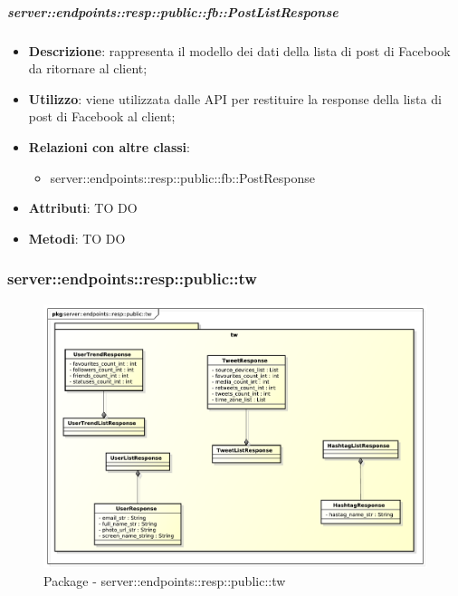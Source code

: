     \subparagraph{server::endpoints::resp::public::fb::PostListResponse} %
    \label{subp:bdsm_app_server_endpoints_resp_public_fb_postlistresponse}
    \begin{itemize}
      \item \textbf{Descrizione}: rappresenta il modello dei dati della lista di post di Facebook da ritornare al client;
      \item \textbf{Utilizzo}: viene utilizzata dalle API per restituire la response della lista di post di Facebook al client;
      \item \textbf{Relazioni con altre classi}:
        \begin{itemize}
          \item server::endpoints::resp::public::fb::PostResponse
        \end{itemize}
	  \item \textbf{Attributi}: TO DO
	  \item \textbf{Metodi}: TO DO
      \end{itemize}

\subsubsection{server::endpoints::resp::public::tw} %
\label{ssub:bdsm_app_server_endpoints_resp_public_tw}
\begin{figure}[!htbp]
	\centering
	\centerline{\includegraphics[scale=0.5]{./images/server/resp_tw.pdf}}
	\caption{Package - server::endpoints::resp::public::tw}
\end{figure}

